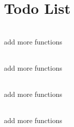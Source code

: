 \chapter{Todo List }
\hypertarget{todo}{}\label{todo}

\begin{DoxyRefList}
\item[{\parbox[t]{\linewidth}{Class \doxylink{classMedicalThermometer}{Medical\+Thermometer} }}]\hfill \\
\label{todo__todo000002}%
%
add more functions  
\item[{\parbox[t]{\linewidth}{Class \doxylink{classMedicalThermometerWithSignal}{Medical\+Thermometer\+With\+Signal} }}]\hfill \\
\label{todo__todo000003}%
%
add more functions  
\item[{\parbox[t]{\linewidth}{Class \doxylink{classMedicalThermometerWithSignalAndDataTransfer}{Medical\+Thermometer\+With\+Signal\+And\+Data\+Transfer} }}]\hfill \\
\label{todo__todo000004}%
%
add more functions  
\item[{\parbox[t]{\linewidth}{Class \doxylink{classThermometer}{Thermometer} }}]\hfill \\
\label{todo__todo000001}%
%
add more functions 
\end{DoxyRefList}